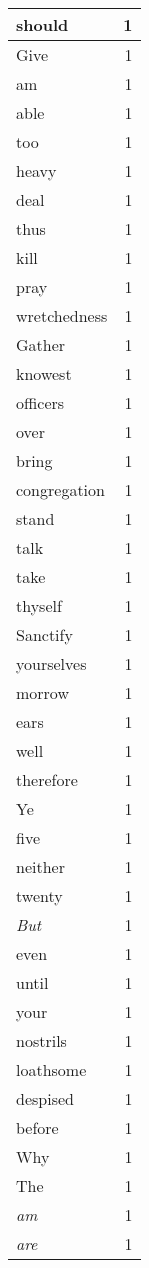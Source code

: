 \begin{center}
\begin{longtable}{l|r}
should & 1 \\ \hline
Give & 1 \\ \hline
am & 1 \\ \hline
able & 1 \\ \hline
too & 1 \\ \hline
heavy & 1 \\ \hline
deal & 1 \\ \hline
thus & 1 \\ \hline
kill & 1 \\ \hline
pray & 1 \\ \hline
wretchedness & 1 \\ \hline
Gather & 1 \\ \hline
knowest & 1 \\ \hline
officers & 1 \\ \hline
over & 1 \\ \hline
bring & 1 \\ \hline
congregation & 1 \\ \hline
stand & 1 \\ \hline
talk & 1 \\ \hline
take & 1 \\ \hline
thyself & 1 \\ \hline
Sanctify & 1 \\ \hline
yourselves & 1 \\ \hline
morrow & 1 \\ \hline
ears & 1 \\ \hline
well & 1 \\ \hline
therefore & 1 \\ \hline
Ye & 1 \\ \hline
five & 1 \\ \hline
neither & 1 \\ \hline
twenty & 1 \\ \hline
\emph{But} & 1 \\ \hline
even & 1 \\ \hline
until & 1 \\ \hline
your & 1 \\ \hline
nostrils & 1 \\ \hline
loathsome & 1 \\ \hline
despised & 1 \\ \hline
before & 1 \\ \hline
Why & 1 \\ \hline
The & 1 \\ \hline
\emph{am} & 1 \\ \hline
\emph{are} & 1 \\ \hline

\end{longtable}
\end{center}

